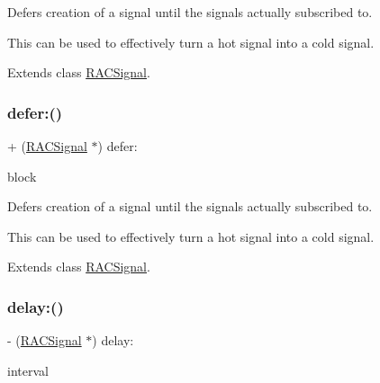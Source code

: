 Defers creation of a signal until the signal\textquotesingle{}s actually subscribed to.

This can be used to effectively turn a hot signal into a cold signal. 

Extends class \mbox{\hyperlink{interface_r_a_c_signal_a3f29638c9c7f60928b7a6cbf2fe25d6f}{R\+A\+C\+Signal}}.

\mbox{\label{category_r_a_c_signal_07_operations_08_a3f29638c9c7f60928b7a6cbf2fe25d6f}} 
\subsubsection{\texorpdfstring{defer\+:()}{defer:()}\hspace{0.1cm}{\footnotesize\ttfamily [3/3]}}
{\footnotesize\ttfamily + (\mbox{\hyperlink{interface_r_a_c_signal}{R\+A\+C\+Signal}} $\ast$) defer\+: \begin{DoxyParamCaption}\item[{(\mbox{\hyperlink{interface_r_a_c_signal}{R\+A\+C\+Signal}} $\ast$($^\wedge$)(void))}]{block }\end{DoxyParamCaption}}

Defers creation of a signal until the signal\textquotesingle{}s actually subscribed to.

This can be used to effectively turn a hot signal into a cold signal. 

Extends class \mbox{\hyperlink{interface_r_a_c_signal_a3f29638c9c7f60928b7a6cbf2fe25d6f}{R\+A\+C\+Signal}}.

\mbox{\label{category_r_a_c_signal_07_operations_08_adc28e5c64d2e6ec8c5ab8465fa6c89b4}} 
\subsubsection{\texorpdfstring{delay\+:()}{delay:()}\hspace{0.1cm}{\footnotesize\ttfamily [1/3]}}
{\footnotesize\ttfamily -\/ (\mbox{\hyperlink{interface_r_a_c_signal}{R\+A\+C\+Signal}} $\ast$) delay\+: \begin{DoxyParamCaption}\item[{(N\+S\+Time\+Interval)}]{interval }\end{DoxyParamCaption}}

